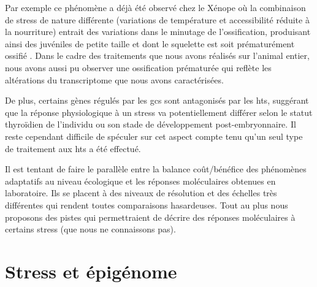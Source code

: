 \documentclass[../main.tex]{subfiles}
\begin{document}
Par exemple ce phénomène a déjà été observé chez le Xénope où la combinaison de stress de nature différente (variations de température et accessibilité réduite à la nourriture) entrait des variations dans le minutage de l’ossification, produisant ainsi des juvéniles de petite taille et dont le squelette est soit prématurément ossifié \citep{Gomez-Mestre2010}.
Dans le cadre des traitements que nous avons réalisés sur l'animal entier, nous avons aussi pu observer une ossification prématurée qui reflète les altérations du transcriptome que nous avons caractérisées.
\par
De plus, certains gènes régulés par les \glspl{gc} sont antagonisés par les \glspl{ht}, suggérant que la réponse physiologique à un stress va potentiellement différer selon le statut thyroïdien de l'individu ou son stade de développement post-embryonnaire.
Il reste cependant difficile de spéculer sur cet aspect compte tenu qu'un seul type de traitement aux \glspl{ht} a été effectué.
\par
Il est tentant de faire le parallèle entre la balance coût/bénéfice des phénomènes adaptatifs au niveau écologique et les réponses moléculaires obtenues en laboratoire.
Ils se placent à des niveaux de résolution et des échelles très différentes qui rendent toutes comparaisons hasardeuses.
Tout au plus nous proposons des pistes qui permettraient de décrire des réponses moléculaires à certains stress (que nous ne connaissons pas).


\section{Stress et épigénome}
\end{document}
